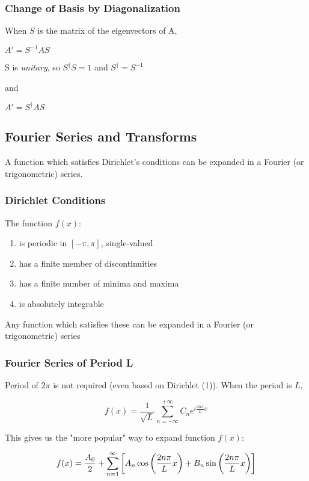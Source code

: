 \documentclass[]{article}
\begin{document}
\subsubsection{Change of Basis by Diagonalization}
When $S$ is the matrix of the eigenvectors of A, 

$A' = S^{-1} A S$

S is \emph{unitary}, so $S^{\dagger}S = 1$ and $S^{\dagger} = S^{-1}$

and 

$A' = S^{\dagger}AS$

\subsection{Fourier Series and Transforms}
A function which satisfies Dirichlet's conditions can be expanded in a Fourier (or trigonometric) series. 

\subsubsection{Dirichlet Conditions}
The function $f(x)$: 
\begin{enumerate}
    \item is periodic in $[-\pi, \pi]$, single-valued
    \item has a finite member of discontinuities
    \item has a finite number of minima and maxima
    \item is absolutely integrable
\end{enumerate}

Any function which satisfies these can be expanded in a Fourier (or trigonometric) series

\subsubsection{Fourier Series of Period L}
Period of $2\pi$ is not required (even based on Dirichlet (1)). When the period is $L$, 

\begin{equation}
    f(x) = \frac{1}{\sqrt{L}}\sum^{+\infty}_{n=-\infty}{C_n e^{i\frac{2n\pi}{L}x}}
\end{equation}

This gives us the "more popular" way to expand function $f(x)$: 

\begin{equation}
    f(x) = \frac{A_0}{2} + \sum^{\infty}_{n=1}{\bigg{[}A_n \cos{\bigg{(}\frac{2n\pi}{L}x}\bigg{)} + B_{n}\sin{\bigg{(}\frac{2n\pi}{L}x\bigg{)}}\bigg{]}}
\end{equation}    
\end{document}
